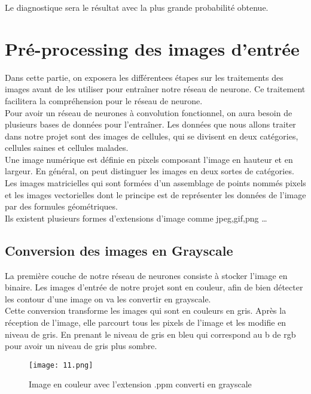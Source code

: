 \documentclass[a4paper,11pt]{report}
\theoremstyle{definition}
\begin{document}
Le diagnostique sera le résultat avec la plus grande probabilité obtenue.

\section{Pré-processing des images d'entrée}
Dans cette partie, on exposera les différentees étapes sur les traitements des images avant de les utiliser pour entraîner notre réseau de neurone. Ce traitement facilitera la compréhension pour le réseau de neurone.\\

Pour avoir un réseau de neurones à convolution fonctionnel, on aura besoin de plusieurs bases de données pour l’entraîner. Les données que nous allons traiter dans notre projet sont des images de cellules, qui se divisent en deux catégories, cellules saines et cellules malades. \\

 Une image numérique est définie en pixels composant l'image en hauteur et en largeur. En général, on peut distinguer les images en deux sortes de catégories. Les images matricielles qui sont formées d’un assemblage de points nommés pixels et les images vectorielles dont le principe est de représenter les données de l'image par des formules géométriques. \\
 
 Ils existent plusieurs formes d'extensions d'image comme jpeg,gif,png …
 
 \subsection{Conversion des images en Grayscale}
 La première couche de notre réseau de neurones consiste à stocker l’image en binaire.
Les images d’entrée de notre projet sont en couleur, afin de bien détecter les contour d’une image on va les convertir en grayscale. \cite{ref11} \\

Cette conversion transforme les images qui sont en couleurs en gris. Après la réception de l'image, elle parcourt tous les pixels de l'image et les modifie en niveau de gris. En prenant le niveau de gris en bleu qui correspond au b de rgb pour avoir un niveau de gris plus sombre. 
\begin{figure}[!htbp]
\begin{center}
\texttt{[image: 11.png]}
\caption{Image en couleur avec l'extension .ppm converti en grayscale \cite{ref11} }
\end{center}
\end{figure}
\end{document}

